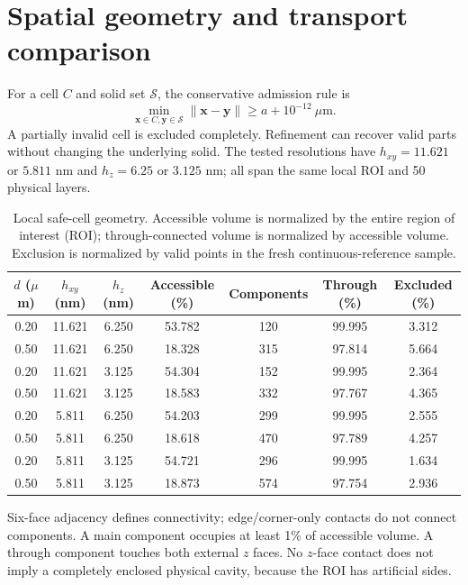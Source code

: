 \documentclass[a4paper,10pt]{article}
\numberwithin{equation}{section}
\begin{document}
\clearpage
\section{Spatial geometry and transport comparison}
For a cell $C$ and solid set $\mathcal S$, the conservative admission rule is
\begin{equation}
\min_{\mathbf x\in C,\mathbf y\in\mathcal S}
\|\mathbf x-\mathbf y\|\ge a+10^{-12}~\mu\mathrm{m}.
\end{equation}
A partially invalid cell is excluded completely. Refinement can recover valid parts without changing the underlying solid. The tested resolutions have $h_{xy}=11.621$ or $5.811$ nm and $h_z=6.25$ or $3.125$ nm; all span the same local ROI and 50 physical layers.

\begin{table}[!htbp]
\centering\small
\setlength{\tabcolsep}{4pt}
\caption{Local safe-cell geometry. Accessible volume is normalized by the entire region of interest (ROI); through-connected volume is normalized by accessible volume. Exclusion is normalized by valid points in the fresh continuous-reference sample.}\label{tab:geometry}
\begin{tabular}{@{}ccccccc@{}}
\toprule
$d$ ($\mu$m) & $h_{xy}$ (nm) & $h_z$ (nm) & Accessible (\%) & Components & Through (\%) & Excluded (\%) \\ \midrule
0.20 & 11.621 & 6.250 & 53.782 & 120 & 99.995 & 3.312 \\
0.50 & 11.621 & 6.250 & 18.328 & 315 & 97.814 & 5.664 \\
0.20 & 11.621 & 3.125 & 54.304 & 152 & 99.995 & 2.364 \\
0.50 & 11.621 & 3.125 & 18.583 & 332 & 97.767 & 4.365 \\
0.20 & 5.811 & 6.250 & 54.203 & 299 & 99.995 & 2.555 \\
0.50 & 5.811 & 6.250 & 18.618 & 470 & 97.789 & 4.257 \\
0.20 & 5.811 & 3.125 & 54.721 & 296 & 99.995 & 1.634 \\
0.50 & 5.811 & 3.125 & 18.873 & 574 & 97.754 & 2.936 \\
\bottomrule
\end{tabular}
\end{table}

Six-face adjacency defines connectivity; edge/corner-only contacts do not connect components. A main component occupies at least 1\% of accessible volume. A through component touches both external $z$ faces. No $z$-face contact does not imply a completely enclosed physical cavity, because the ROI has artificial sides.
\end{document}
